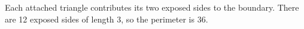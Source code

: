 Each attached triangle contributes its two exposed sides to the boundary. There are 12 exposed sides of length 3, so the perimeter is $\boxed{36}$.
